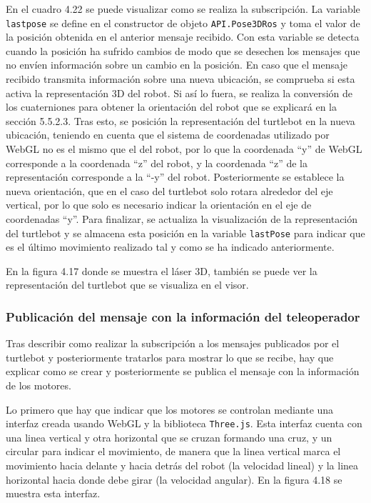 En el cuadro 4.22 se puede visualizar como se realiza la subscripción. La variable \texttt{lastpose} se define en el constructor de objeto \texttt{API.Pose3DRos} y toma el valor de la posición obtenida en el anterior mensaje recibido. Con esta variable se detecta cuando la posición ha sufrido cambios de modo que se desechen los mensajes que no envíen información sobre un cambio en la posición. En caso que el mensaje recibido transmita información sobre una nueva ubicación, se comprueba si esta activa la representación 3D del robot. Si así lo fuera, se realiza la conversión de los cuaterniones para obtener la orientación del robot que se explicará en la sección 5.5.2.3. Tras esto, se posición la representación del turtlebot en la nueva ubicación, teniendo en cuenta que el sistema de coordenadas utilizado por WebGL no es el mismo que el del robot, por lo que la coordenada ``y'' de WebGL corresponde a la coordenada ``z'' del robot, y la coordenada ``z'' de la representación corresponde a la ``-y'' del robot. Posteriormente se establece la nueva orientación, que en el caso del turtlebot solo rotara alrededor del eje vertical, por lo que solo es necesario indicar la orientación en el eje de coordenadas ``y''. Para finalizar, se actualiza la visualización de la representación del turtlebot y se almacena esta posición en la variable \texttt{lastPose} para indicar que es el último movimiento realizado tal y como se ha indicado anteriormente.

En la figura 4.17 donde se muestra el láser 3D, también se puede ver la representación del turtlebot que se visualiza en el visor.

\subsubsection{Publicación del mensaje con la información del teleoperador}

Tras describir como realizar la subscripción a los mensajes publicados por el turtlebot y posteriormente tratarlos para mostrar lo que se recibe, hay que explicar como se crear y posteriormente se publica el mensaje con la información de los motores.

Lo primero que hay que indicar que los motores se controlan mediante una interfaz creada usando WebGL y la biblioteca \texttt{Three.js}. Esta interfaz cuenta con una linea vertical y otra horizontal que se cruzan formando una cruz, y un circular para indicar el movimiento, de manera que la linea vertical marca el movimiento hacia delante y hacia detrás del robot (la velocidad lineal) y la linea horizontal hacia donde debe girar (la velocidad angular). En la figura 4.18 se muestra esta interfaz.

